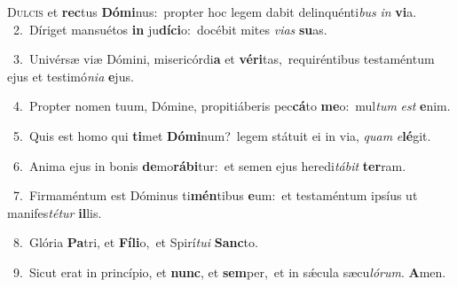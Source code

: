 \lettrine{\initial\textcolor{\initialcolor}{D}}{ulcis} et \textbf{rec}\-tus \textbf{Dó}\-\textbf{mi}nus:~\star propter hoc legem dabit delinquénti\textit{bus} \textit{in} \textbf{vi}\-a.\\
{\numbfont\textcolor{\numbcolor}{~2.}}~Díriget mansuétos \textbf{in} ju\-\textbf{dí}\-\textbf{ci}o:~\star docébit mites \textit{vi}\-\textit{as} \textbf{su}\-as.\par
{\numbfont\textcolor{\numbcolor}{~3.}}~Univérsæ viæ Dómini, misericórdi\textbf{a} et \textbf{vé}\-\textbf{ri}tas,~\star requiréntibus testaméntum ejus et testimó\-\textit{ni}\-\textit{a} \textbf{e}\-jus.\par
{\numbfont\textcolor{\numbcolor}{~4.}}~Propter nomen tuum, Dómine, propitiáberis pec\-\textbf{cá}\-to \textbf{me}\-o:~\star mul\textit{tum} \textit{est} \textbf{e}\-nim.\par
{\numbfont\textcolor{\numbcolor}{~5.}}~Quis est homo qui \textbf{ti}\-met \textbf{Dó}\-\textbf{mi}num?~\star legem státuit ei in via, \textit{quam} \textit{e}\-\textbf{lé}git.\par
{\numbfont\textcolor{\numbcolor}{~6.}}~Anima ejus in bonis \textbf{de}\-mo\-\textbf{rá}\-\textbf{bi}tur:~\star et semen ejus heredi\-\textit{tá}\-\textit{bit} \textbf{ter}\-ram.\par
{\numbfont\textcolor{\numbcolor}{~7.}}~Firmaméntum est Dóminus ti\-\textbf{mén}\-tibus \textbf{e}\-um:~\star et testaméntum ipsíus ut manifes\-\textit{té}\-\textit{tur} \textbf{il}\-lis.\par
{\numbfont\textcolor{\numbcolor}{~8.}}~Glória \textbf{Pa}\-tri, et \textbf{Fí}\-\textbf{li}o,~\star et Spirí\-\textit{tu}\-\textit{i} \textbf{Sanc}\-to.\par
{\numbfont\textcolor{\numbcolor}{~9.}}~Sicut erat in princípio, et \textbf{nunc}\-, et \textbf{sem}\-per,~\star et in sǽcula sæcu\-\textit{ló}\-\textit{rum}. \textbf{A}\-men.\par
